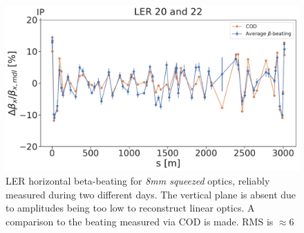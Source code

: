 \begin{figure}[!htb]
    \centering
    \includegraphics[width=0.7\linewidth]{images/kek/ler_20_22_bet_x.pdf}
    \caption{LER horizontal beta-beating for \textit{8mm squeezed} optics, reliably measured during
    two different days. The vertical plane is absent due to amplitudes being too low to reconstruct
    linear optics. A comparison to the beating measured via COD is made. RMS is $\approx 6$}
    \label{fig:kek:beating_ler_squeezed}
\end{figure}



